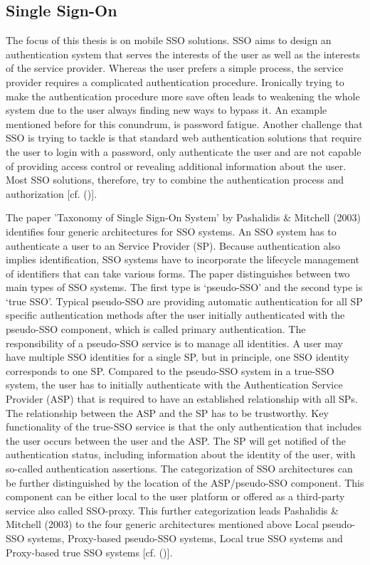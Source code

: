 {{		\subsection{Single Sign-On}
		\label{singlesignon}	The focus of this thesis is on mobile SSO solutions. SSO aims to design an authentication system that serves the interests of the user as well as the interests of the service provider. Whereas the user prefers a simple process, the service provider requires a complicated authentication procedure. Ironically trying to make the authentication procedure more save often leads to weakening the whole system due to the user always finding new ways to bypass it. An example mentioned before for this conundrum, is password fatigue. Another challenge that SSO is trying to tackle is that standard web authentication solutions that require the user to login with a password, only authenticate the user and are not capable of providing access control or revealing additional information about the user. Most SSO solutions, therefore, try to combine the authentication process and authorization [cf. (\cite{Prochazka:2010:UCA})].
		
		The paper 'Taxonomy of Single Sign-On System' by Pashalidis \& Mitchell (2003) identifies four generic architectures for SSO systems. An SSO system has to authenticate a user to an Service Provider (SP). Because authentication also implies identification, SSO systems have to incorporate the lifecycle management of identifiers that can take various forms. The paper distinguishes between two main types of SSO systems. The first type is ‘pseudo-SSO’ and the second type is ‘true SSO’. Typical pseudo-SSO are providing automatic authentication for all SP specific authentication methods after the user initially authenticated with the pseudo-SSO component, which is called primary authentication. The responsibility of a pseudo-SSO service is to manage all identities. A user may have multiple SSO identities for a single SP, but in principle, one SSO identity corresponds to one SP. Compared to the pseudo-SSO system in a true-SSO system, the user has to initially authenticate with the Authentication Service Provider (ASP) that is required to have an established relationship with all SPs. The relationship between the ASP and the SP has to be trustworthy. Key functionality of the true-SSO service is that the only authentication that includes the user occurs between the user and the ASP. The SP will get notified of the authentication status, including information about the identity of the user, with so-called authentication assertions. The categorization of SSO architectures can be further distinguished by the location of the ASP/pseudo-SSO component. This component can be either local to the user platform or offered as a third-party service also called SSO-proxy. This further categorization leads Pashalidis \& Mitchell (2003) to the four generic architectures mentioned above Local pseudo-SSO systems, Proxy-based pseudo-SSO systems, Local true SSO systems and Proxy-based true SSO systems  [cf. (\cite{Pashalidis:2003:10.1007/3-540-45067-X_22})].
		
}}
